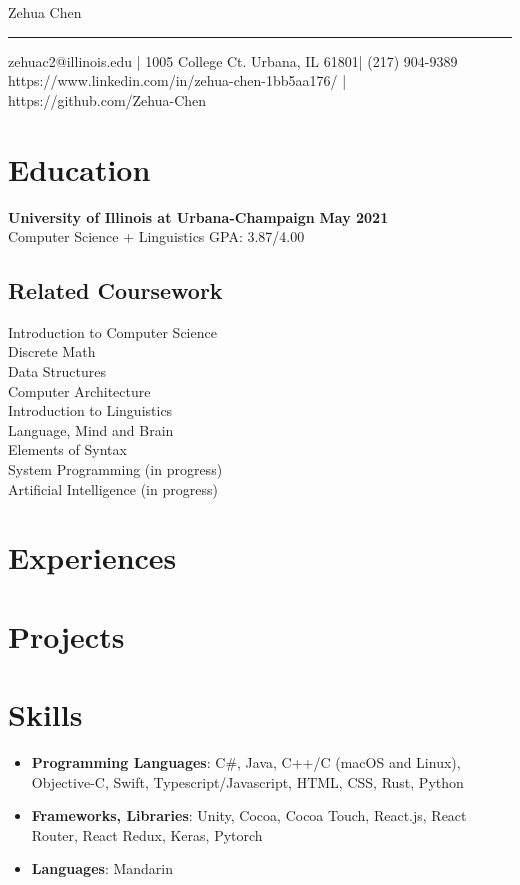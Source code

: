 \documentclass[10pt, letterpaper]{article}
\begin{document}
  \begin{center}
    {\huge Zehua Chen} \\
    \rule{\textwidth}{1pt}
    zehuac2@illinois.edu | 1005 College Ct. Urbana, IL 61801| (217) 904-9389 \\
    https://www.linkedin.com/in/zehua-chen-1bb5aa176/ | https://github.com/Zehua-Chen
  \end{center}

  \section{Education}
  {\large\textbf{University of Illinois at Urbana-Champaign}} \hfill {\large\textbf{May 2021}} \\
  {Computer Science + Linguistics} \hfill {GPA: 3.87/4.00}

  \subsection{Related Coursework}

  \vspace{0pt}

  \begin{multicols}{3}
    Introduction to Computer Science \\
    Discrete Math \\
    Data Structures \\
    Computer Architecture \\
    Introduction to Linguistics \\
    Language, Mind and Brain \\
    Elements of Syntax \\
    System Programming (in progress) \\
    Artificial Intelligence (in progress)
  \end{multicols}

  \section{Experiences}
  
  
  

  \section{Projects}
  
  
  

  \section{Skills}
  \begin{itemize}
    \item \textbf{Programming Languages}: C\#, Java, C++/C (macOS and Linux),
    Objective-C, Swift, Typescript/Javascript, HTML, CSS, Rust, Python
    \item \textbf{Frameworks, Libraries}: Unity, Cocoa, Cocoa Touch, React.js,
    React Router, React Redux, Keras, Pytorch
    \item \textbf{Languages}: Mandarin
  \end{itemize}
\end{document}
